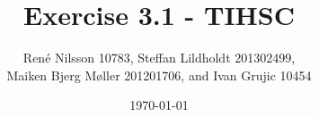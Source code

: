 \documentclass[]{report}
\begin{document}
\title{Exercise 3.1 - TIHSC}
\author{René Nilsson 10783, Steffan Lildholdt 201302499,\\ Maiken Bjerg Møller 201201706, and Ivan Grujic 10454}
\date{\today}
\maketitle
{}

\tableofcontents










\end{document}
